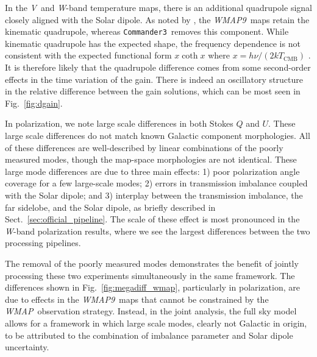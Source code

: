 \documentclass[twocolumn]{../../common/aa}
\def\WMAP{\emph{WMAP}}
\def\WMAPnine{\emph{WMAP9}}
\def\commanderthree{\texttt{Commander3}}
\newcommand{\V}[0]{\textit V}
\newcommand{\W}[0]{\textit W}
\begin{document}
In the \V\ and \W-band temperature maps, there is an additional quadrupole signal closely aligned with the Solar dipole. As noted by \citet{larson2014}, the \WMAPnine\ maps retain the kinematic quadrupole, whereas \commanderthree\ removes this component. While kinematic quadrupole has the expected shape, the frequency dependence is not consistent with the expected functional form $x\coth x$ where $x=h\nu/(2kT_\mathrm{CMB})$ \citep{Notari:2015}. It is therefore likely that the quadrupole difference comes from some second-order effects in the time variation of the gain. There is indeed an oscillatory structure in the relative difference between the gain solutions, which can be most seen in Fig.~\ref{fig:dgain}.



In polarization, we note large scale differences in both Stokes $Q$ and $U$. These large scale differences do not match known Galactic component morphologies. All of these differences are well-described by linear combinations of the  poorly measured modes, though the map-space morphologies are not identical. These large mode differences are due to three main effects: 1) poor polarization angle coverage for a few large-scale modes; 2) errors in transmission imbalance coupled with the Solar dipole; and 3) interplay between the transmission imbalance, the far sidelobe, and the Solar dipole, as briefly described in Sect.~\ref{sec:official_pipeline}. The scale of these effect is most pronounced in the \W-band polarization results, where we see the largest differences between the two processing pipelines.

The removal of the poorly measured modes demonstrates the benefit of jointly processing these two experiments simultaneously in the same framework. The differences shown in Fig.~\ref{fig:megadiff_wmap}, particularly in polarization, are due to effects in the \WMAPnine\ maps that cannot be constrained by the \WMAP\ observation strategy. 
Instead, in the joint analysis, the full sky model allows for a framework in which large scale modes,
clearly not Galactic in origin, to be attributed to the combination of imbalance parameter and Solar dipole uncertainty. 


\end{document}
